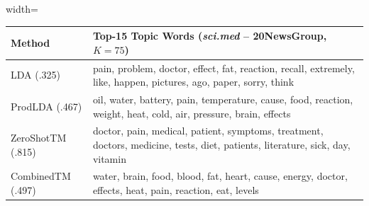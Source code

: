 \documentclass{article}
\theoremstyle{plain}
\theoremstyle{definition}
\theoremstyle{remark}
\begin{document}
\begin{table}[t]
\centering
\scriptsize
\setlength{\tabcolsep}{3pt}
\renewcommand{\arraystretch}{1.2}

\begin{adjustbox}{width=\linewidth}
\begin{tabular}{@{}l l@{}}
\toprule
\textbf{Method} & \textbf{Top-15 Topic Words (\textit{sci.med} -- 20NewsGroup, $K=75$)} \\
\midrule
{\tiny LDA (.325)} & \textcolor{green!90!black}{pain}, \textcolor{green!60!black}{problem}, \textcolor{green!90!black}{doctor}, \textcolor{green!40!black}{effect}, \textcolor{black!70}{fat}, \textcolor{black!40}{reaction}, \textcolor{black!70}{recall}, \textcolor{black!70}{extremely}, \textcolor{green!60!black}{like}, \textcolor{green!40!black}{happen}, \textcolor{black!40}{pictures}, \textcolor{green!40!black}{ago}, \textcolor{black!40}{paper}, \textcolor{green!60!black}{sorry}, \textcolor{green!90!black}{think} \\
{\tiny ProdLDA (.467)} & \textcolor{black!70}{oil}, \textcolor{green!60!black}{water}, \textcolor{black!70}{battery}, \textcolor{black!40}{pain}, \textcolor{green!40!black}{temperature}, \textcolor{green!40!black}{cause}, \textcolor{green!60!black}{food}, \textcolor{black!70}{reaction}, \textcolor{green!90!black}{weight}, \textcolor{green!60!black}{heat}, \textcolor{green!90!black}{cold}, \textcolor{green!90!black}{air}, \textcolor{green!40!black}{pressure}, \textcolor{black!40}{brain}, \textcolor{black!40}{effects} \\
{\tiny ZeroShotTM (.815)} & \textcolor{green!90!black}{doctor}, \textcolor{black!70}{pain}, \textcolor{green!60!black}{medical}, \textcolor{green!60!black}{patient}, \textcolor{green!90!black}{symptoms}, \textcolor{green!40!black}{treatment}, \textcolor{green!90!black}{doctors}, \textcolor{green!40!black}{medicine}, \textcolor{black!70}{tests}, \textcolor{green!40!black}{diet}, \textcolor{green!60!black}{patients}, \textcolor{black!40}{literature}, \textcolor{black!40}{sick}, \textcolor{black!40}{day}, \textcolor{black!70}{vitamin} \\
{\tiny CombinedTM (.497)} & \textcolor{black!70}{water}, \textcolor{black!40}{brain}, \textcolor{green!90!black}{food}, \textcolor{green!90!black}{blood}, \textcolor{black!70}{fat}, \textcolor{black!40}{heart}, \textcolor{green!40!black}{cause}, \textcolor{green!60!black}{energy}, \textcolor{green!90!black}{doctor}, \textcolor{green!40!black}{effects}, \textcolor{black!70}{heat}, \textcolor{green!60!black}{pain}, \textcolor{black!40}{reaction}, \textcolor{green!60!black}{eat}, \textcolor{green!40!black}{levels} \\

\end{tabular}
\end{adjustbox}
\end{table}
\end{document}
